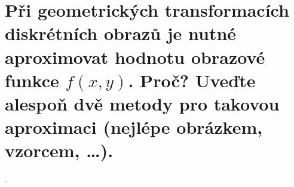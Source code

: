 \section{Při geometrických transformacích diskrétních obrazů je nutné aproximovat hodnotu obrazové funkce 
\texorpdfstring{$f(x,y)$}{f(x,y)}. Proč? Uveďte alespoň dvě metody pro takovou aproximaci (nejlépe obrázkem, vzorcem, 
\dots).}.